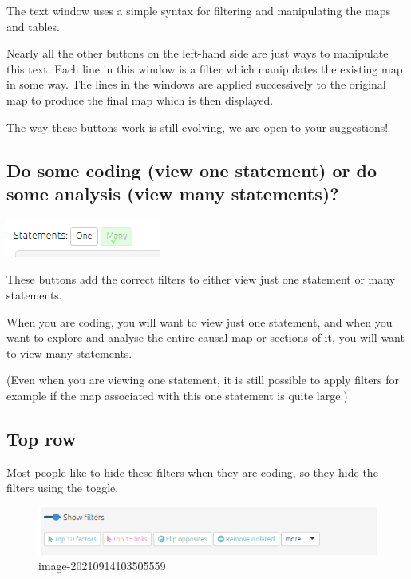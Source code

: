 \documentclass[
]{book}
\begin{document}
The text window uses a simple syntax for filtering and manipulating the maps and tables.

Nearly all the other buttons on the left-hand side are just ways to manipulate this text. Each line in this window is a filter which manipulates the existing map in some way. The lines in the windows are applied successively to the original map to produce the final map which is then displayed.

The way these buttons work is still evolving, we are open to your suggestions!

\hypertarget{do-some-coding-view-one-statement-or-do-some-analysis-view-many-statements}{%
\subsection{Do some coding (view one statement) or do some analysis (view many statements)?}\label{do-some-coding-view-one-statement-or-do-some-analysis-view-many-statements}}

\includegraphics{_assets/00600-tour0.png}

These buttons add the correct filters to either view just one statement or many statements.

When you are coding, you will want to view just one statement, and when you want to explore and analyse the entire causal map or sections of it, you will want to view many statements.

(Even when you are viewing one statement, it is still possible to apply filters for example if the map associated with this one statement is quite large.)

\hypertarget{top-row}{%
\subsection{Top row}\label{top-row}}

Most people like to hide these filters when they are coding, so they hide the filters using the toggle.

\begin{figure}
\centering
\includegraphics{_assets/image-20210914103505559.png}
\caption{image-20210914103505559}
\end{figure}
\end{document}

